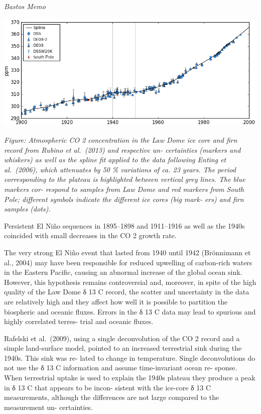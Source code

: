 \documentclass[
]{book}
\begin{document}
\emph{Bastos Memo}

\includegraphics{fig/Law_Dome_CO2_1900-2000.png}

\emph{Figure: Atmospheric CO 2 concentration in the Law Dome ice
core and firn record from Rubino et al.~(2013) and respective un-
certainties (markers and whiskers) as well as the spline fit applied
to the data following Enting et al.~(2006), which attenuates by 50 \%
variations of ca. 23 years. The period corresponding to the plateau
is highlighted between vertical grey lines. The blue markers cor-
respond to samples from Law Dome and red markers from South
Pole; different symbols indicate the different ice cores (big mark-
ers) and firn samples (dots).}

Persistent El Niño sequences in
1895--1898 and 1911--1916 as well as the 1940s coincided
with small decreases in the CO 2 growth rate.

The very strong El Niño event that
lasted from 1940 until 1942 (Brönnimann et al., 2004) may
have been responsible for reduced upwelling of carbon-rich
waters in the Eastern Pacific, causing an abnormal increase
of the global ocean sink. However, this hypothesis remains
controversial and, moreover, in spite of the high quality of
the Law Dome δ 13 C record, the scatter and uncertainty in the
data are relatively high and they affect how well it is possible
to partition the biospheric and oceanic fluxes. Errors in the
δ 13 C data may lead to spurious and highly correlated terres-
trial and oceanic fluxes.

Rafelski et al.~(2009), using a single deconvolution of the
CO 2 record and a simple land-surface model, pointed to an
increased terrestrial sink during the 1940s. This sink was re-
lated to change in temperature. Single deconvolutions do not
use the δ 13 C information and assume time-invariant ocean re-
sponse. When terrestrial uptake is used to explain the 1940s
plateau they produce a peak in δ 13 C that appears to be incon-
sistent with the ice-core δ 13 C measurements, although the
differences are not large compared to the measurement un-
certainties.
\end{document}
